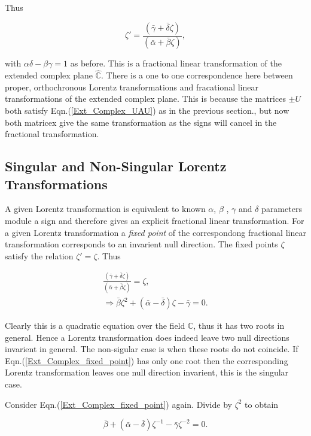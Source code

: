 \noindent Thus 

\begin{equation*}
\zeta' = \frac{(\bar{\gamma} + \bar{\delta}\zeta)}{(\bar{\alpha} + \bar{\beta}\zeta)},
\end{equation*}

\noindent with $\alpha\delta - \beta\gamma = 1$ as before. This is a fractional linear transformation of the extended complex plane $\hat{\mathbb{C}}$. There is a one to one correspondence here between proper, orthochronous Lorentz transformations and fracational linear transformations of the extended complex plane. This is because the matrices $\pm U$ both satisfy Eqn.(\ref{Ext_Complex_UAU}) as in the previous section., but now both matricex give the same transformation as the signs will cancel in the fractional transformation.

\subsection{Singular and Non-Singular Lorentz Transformations}

A given Lorentz transformation is equivalent to known $\alpha$, $\beta$ , $\gamma$ and $\delta$ parameters module a sign and therefore gives an explicit fractional linear transformation. For a given Lorentz transformation a \textit{fixed point} of the correspondong fractional linear transformation corresponds to an invarient null direction. The fixed points $\zeta$ satisfy the relation $\zeta' = \zeta$. Thus

\begin{eqnarray}\nonumber
\frac{(\bar{\gamma} + \bar{\delta}\zeta)}{(\bar{\alpha} + \bar{\beta}\zeta)} = \zeta, \\\label{Ext_Complex_fixed_point}
\Rightarrow \bar{\beta}\zeta^2 + (\bar{\alpha}- \bar{\delta})\zeta - \bar{\gamma} = 0. 
\end{eqnarray}

\noindent Clearly this is a quadratic equation over the field $\mathbb{C}$, thus it has two roots in general. Hence a Lorentz transformation does indeed leave two null directions invarient in general. The non-sigular case is when these roots do not coincide. If Eqn.(\ref{Ext_Complex_fixed_point}) has only one root then the corresponding Lorentz transformation leaves one null direction invarient, this is the singular case.

Consider Eqn.(\ref{Ext_Complex_fixed_point}) again. Divide by $\zeta^2$ to obtain

\begin{equation*}
\bar{\beta} + (\bar{\alpha}- \bar{\delta})\zeta^{-1} - \bar{\gamma}\zeta^{-2} = 0.
\end{equation*}

